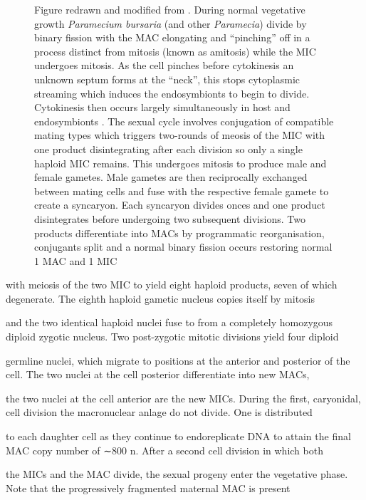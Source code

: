 \begin{figure}[h!]
    \caption{
        Figure redrawn and modified from \citep{Duret2008}.
        During normal vegetative growth \textit{Paramecium bursaria} (and other \textit{Paramecia}) divide by binary fission with the MAC
        elongating and ``pinching'' off in a process distinct from mitosis (known as amitosis) while the MIC undergoes mitosis.
        As the cell pinches before cytokinesis an unknown septum forms at the ``neck'', this stops cytoplasmic streaming which induces
        the endosymbionts to begin to divide. Cytokinesis then occurs largely simultaneously in host and endosymbionts \citep{Kadono2004,Takahashi2007}.
        The sexual cycle involves conjugation of compatible mating types which triggers two-rounds of meosis of the MIC with
        one product disintegrating after each division so only a single haploid MIC remains. This undergoes mitosis to produce male and
        female gametes. Male gametes are then reciprocally exchanged between mating cells and fuse with the respective female gamete to 
        create a syncaryon. Each syncaryon divides onces and one product disintegrates before undergoing two subsequent divisions.
        Two products differentiate into MACs by programmatic reorganisation, conjugants split and a normal binary fission occurs 
    restoring normal 1 MAC and 1 MIC \citep{Siegel1963} }%

\end{figure}

        with meiosis of the two MIC to yield eight haploid products, seven of which degenerate. The eighth haploid gametic nucleus copies itself by mitosis

        and the two identical haploid nuclei fuse to from a completely homozygous diploid zygotic nucleus. Two post-zygotic mitotic divisions yield four diploid

        germline nuclei, which migrate to positions at the anterior and posterior of the cell. The two nuclei at the cell posterior differentiate into new MACs,

        the two nuclei at the cell anterior are the new MICs. During the first, caryonidal, cell division the macronuclear anlage do not divide. One is distributed

        to each daughter cell as they continue to endoreplicate DNA to attain the final MAC copy number of ∼800 n. After a second cell division in which both

        the MICs and the MAC divide, the sexual progeny enter the vegetative phase. Note that the progressively fragmented maternal MAC is present

